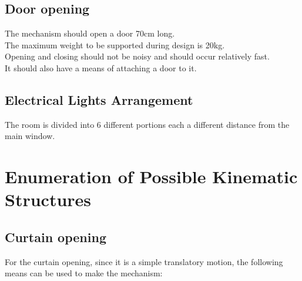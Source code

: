 \documentclass[oneside,notitlepage]{book}
\begin{document}
\subsection{Door opening}
The mechanism should open a door 70cm long.
\\
The maximum weight to be supported during design is 20kg.
\\
Opening and closing should not be noisy and should occur relatively fast.
\\It should also have a means of attaching a door to it.

\subsection{Electrical Lights Arrangement}
The room is divided into 6 different portions each a different distance from the main window.

\section{Enumeration of Possible Kinematic Structures}
\subsection{Curtain opening}
For the curtain opening, since it is a simple translatory motion, the following means can be used to make the mechanism:
\end{document}
